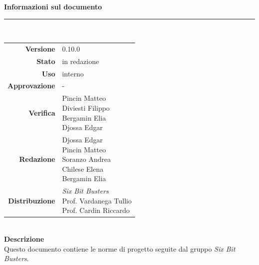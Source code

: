 \begin{titlepage}
\begin{center}
	\large \textbf{Informazioni sul documento} \\
	\rule{0.6\textwidth}{0.4pt}
	\\[0.5cm]
	\begin{tabular}{r|l}
		\textbf{Versione} & 0.10.0\\
		\textbf{Stato} & in redazione\\
		\textbf{Uso} & interno\\                         
		\textbf{Approvazione} & -\\                      
		\textbf{Verifica} & \parbox[t]{5cm}{Pincin Matteo\\ Diviesti Filippo\\ Bergamin Elia\\ Djossa Edgar}\\                        
		\textbf{Redazione} & \parbox[t]{5cm}{Djossa Edgar \\ Pincin Matteo \\ Soranzo Andrea\\ Chilese Elena \\ Bergamin Elia}\\
		\textbf{Distribuzione} & \parbox[t]{5cm}{ \textit{Six Bit Busters} \\ Prof. Vardanega Tullio 
	 \\ Prof. Cardin Riccardo}
	\end{tabular}	
	\\[1.2cm]

	\large \textbf{Descrizione} \\
	Questo documento contiene le norme di progetto seguite dal gruppo \textit{Six Bit Busters}.
	
	
	
	\end{center}
\end{titlepage}
